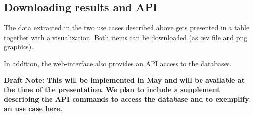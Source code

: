 \subsection{Downloading results and API}

The data extracted in the two use cases described above gets presented in a table together with a visualization. Both items can be downloaded (as csv file and png graphics).

In addition, the web-interface also provides an API access to the databases. 

\textbf{Draft Note: This will be implemented in May and will be available at the time of the presentation. We plan to include a supplement describing the API commands to access the database and to exemplify  an use case here.}

